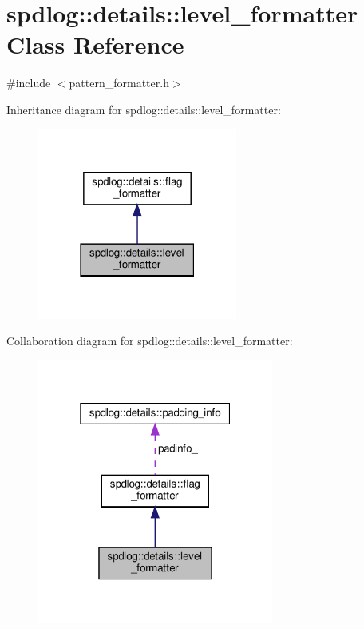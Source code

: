 \hypertarget{classspdlog_1_1details_1_1level__formatter}{}\section{spdlog\+:\+:details\+:\+:level\+\_\+formatter Class Reference}
\label{classspdlog_1_1details_1_1level__formatter}


{\ttfamily \#include $<$pattern\+\_\+formatter.\+h$>$}



Inheritance diagram for spdlog\+:\+:details\+:\+:level\+\_\+formatter\+:
\nopagebreak
\begin{figure}[H]
\begin{center}
\leavevmode
\includegraphics[width=186pt]{classspdlog_1_1details_1_1level__formatter__inherit__graph}
\end{center}
\end{figure}


Collaboration diagram for spdlog\+:\+:details\+:\+:level\+\_\+formatter\+:
\nopagebreak
\begin{figure}[H]
\begin{center}
\leavevmode
\includegraphics[width=220pt]{classspdlog_1_1details_1_1level__formatter__coll__graph}
\end{center}
\end{figure}
